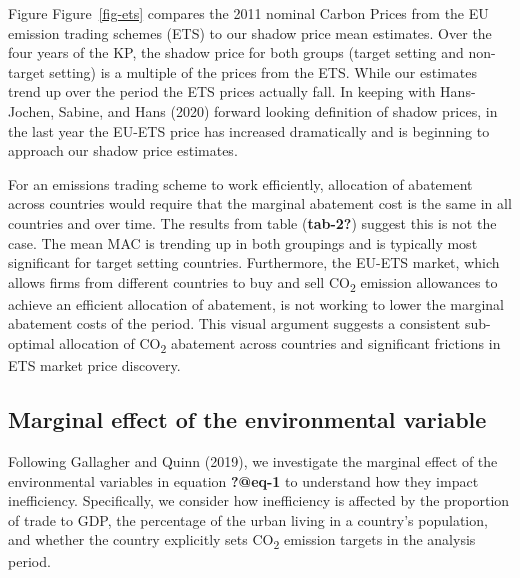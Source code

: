 \documentclass[
  letterpaper,
  DIV=11,
  numbers=noendperiod]{scrartcl}
\begin{document}
Figure Figure~\ref{fig-ets} compares the 2011 nominal Carbon Prices from
the EU emission trading schemes (ETS) to our shadow price mean
estimates. Over the four years of the KP, the shadow price for both
groups (target setting and non-target setting) is a multiple of the
prices from the ETS. While our estimates trend up over the period the
ETS prices actually fall. In keeping with Hans-Jochen, Sabine, and Hans
(2020) forward looking definition of shadow prices, in the last year the
EU-ETS price has increased dramatically and is beginning to approach our
shadow price estimates.

For an emissions trading scheme to work efficiently, allocation of
abatement across countries would require that the marginal abatement
cost is the same in all countries and over time. The results from table
(\textbf{tab-2?}) suggest this is not the case. The mean MAC is trending
up in both groupings and is typically most significant for target
setting countries. Furthermore, the EU-ETS market, which allows firms
from different countries to buy and sell CO\textsubscript{2} emission
allowances to achieve an efficient allocation of abatement, is not
working to lower the marginal abatement costs of the period. This visual
argument suggests a consistent sub-optimal allocation of
CO\textsubscript{2} abatement across countries and significant frictions
in ETS market price discovery.

\hypertarget{marginal-effect-of-the-environmental-variable}{%
\subsection{Marginal effect of the environmental
variable}\label{marginal-effect-of-the-environmental-variable}}

Following Gallagher and Quinn (2019), we investigate the marginal effect
of the environmental variables in equation \textbf{?@eq-1} to understand
how they impact inefficiency. Specifically, we consider how inefficiency
is affected by the proportion of trade to GDP, the percentage of the
urban living in a country's population, and whether the country
explicitly sets CO\textsubscript{2} emission targets in the analysis
period.
\end{document}
